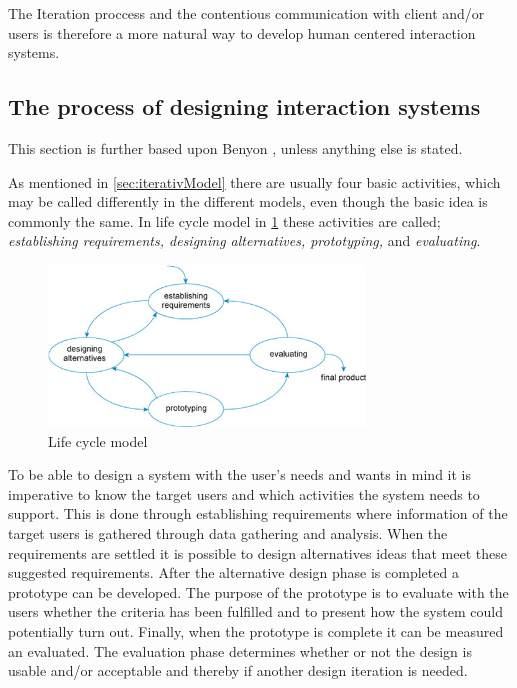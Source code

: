 The Iteration proccess and the contentious communication with client and/or users is therefore a more natural way to develop human centered interaction systems.


\subsection{The process of designing interaction systems}\label{sec:Iterative1}
This section is further based upon Benyon \cite{Benyon}, unless anything else is stated.

As mentioned in \cref{sec:iterativModel} there are usually four basic activities, which may be called differently in the different models, even though the basic idea is commonly the same.
In life cycle model in \cref{fig:LifeCycleModel} these activities are called;
\textit{establishing requirements, designing alternatives, prototyping,} and \textit{evaluating}. 

\begin{figure}[H]
	\centering
	\includegraphics[width=0.75\textwidth]{billeder/lifecycle.png}
	\caption{Life cycle model \citep[p.~332]{InteractionDesign}}\label{fig:LifeCycleModel}
\end{figure}

To be able to design a system with the user’s needs and wants in mind it is imperative to know the target users and which activities the system needs to support. 
This is done through establishing requirements where information of the target users is gathered through data gathering and analysis. 
When the requirements are settled it is possible to design alternatives ideas that meet these suggested requirements. 
After the alternative design phase is completed a prototype can be developed. 
The purpose of the prototype is to evaluate with the users whether the criteria has been fulfilled and to present how the system could potentially turn out. 
Finally, when the prototype is complete it can be measured an evaluated. 
The evaluation phase determines whether or not the design is usable and/or acceptable and thereby if another design iteration is needed.

